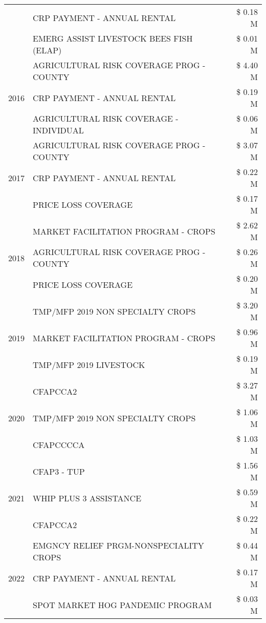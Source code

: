\begin{tabular}{llr}
 & CRP PAYMENT - ANNUAL RENTAL & \$ 0.18 M \\
 & EMERG ASSIST LIVESTOCK BEES FISH (ELAP) & \$ 0.01 M \\
\cline{1-3}
\multirow[t]{3}{*}{2016} & AGRICULTURAL RISK COVERAGE PROG - COUNTY & \$ 4.40 M \\
 & CRP PAYMENT - ANNUAL RENTAL & \$ 0.19 M \\
 & AGRICULTURAL RISK COVERAGE - INDIVIDUAL & \$ 0.06 M \\
\cline{1-3}
\multirow[t]{3}{*}{2017} & AGRICULTURAL RISK COVERAGE PROG - COUNTY & \$ 3.07 M \\
 & CRP PAYMENT - ANNUAL RENTAL & \$ 0.22 M \\
 & PRICE LOSS COVERAGE & \$ 0.17 M \\
\cline{1-3}
\multirow[t]{3}{*}{2018} & MARKET FACILITATION PROGRAM - CROPS & \$ 2.62 M \\
 & AGRICULTURAL RISK COVERAGE PROG - COUNTY & \$ 0.26 M \\
 & PRICE LOSS COVERAGE & \$ 0.20 M \\
\cline{1-3}
\multirow[t]{3}{*}{2019} & TMP/MFP 2019 NON SPECIALTY CROPS & \$ 3.20 M \\
 & MARKET FACILITATION PROGRAM - CROPS & \$ 0.96 M \\
 & TMP/MFP 2019 LIVESTOCK & \$ 0.19 M \\
\cline{1-3}
\multirow[t]{3}{*}{2020} & CFAPCCA2 & \$ 3.27 M \\
 & TMP/MFP 2019 NON SPECIALTY CROPS & \$ 1.06 M \\
 & CFAPCCCCA & \$ 1.03 M \\
\cline{1-3}
\multirow[t]{3}{*}{2021} & CFAP3 - TUP & \$ 1.56 M \\
 & WHIP PLUS 3 ASSISTANCE & \$ 0.59 M \\
 & CFAPCCA2 & \$ 0.22 M \\
\cline{1-3}
\multirow[t]{3}{*}{2022} & EMGNCY RELIEF PRGM-NONSPECIALITY CROPS & \$ 0.44 M \\
 & CRP PAYMENT - ANNUAL RENTAL & \$ 0.17 M \\
 & SPOT MARKET HOG PANDEMIC PROGRAM & \$ 0.03 M \\
\cline{1-3}
\bottomrule
\end{tabular}
